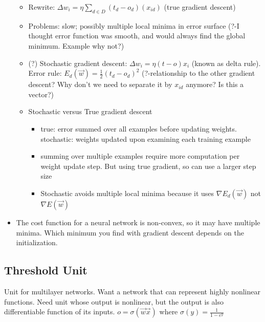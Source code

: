 \documentclass[11pt]{article}
\begin{document}
\begin{itemize}
\begin{itemize}
\item Rewrite: $\Delta w_i = \eta \sum_{d\in D} (t_d - o_d) (x_{id})$ (true gradient descent)
\item Problems: slow; possibly multiple local minima in error surface (?-I thought error function was smooth, and would always find the global minimum. Example why not?)
\item (?) Stochastic gradient descent: $\Delta w_i = \eta (t-o)x_i$ (known as delta rule). Error rule: $E_d(\vec{w}) = \frac{1}{2} (t_d - o_d)^2$ (?-relationship to the other gradient descent? Why don't we need to separate it by $x_{id}$ anymore? Is this a vector?)
\item Stochastic versus True gradient descent
\begin{itemize}
\item true: error summed over all examples before updating weights. stochastic: weights updated upon examining each training example
\item summing over multiple examples require more computation per weight update step. But using true gradient, so can use a larger step size
\item Stochastic avoids multiple local minima because it uses $\nabla E_d(\vec{w})$ not $\nabla E(\vec{w})$
\end{itemize}
\end{itemize}
\item The cost function for a neural network is non-convex, so it may have multiple minima. Which minimum you find with gradient descent depends on the initialization.
\end{itemize}

\subsection{Threshold Unit}
Unit for multilayer networks. Want a network that can represent highly nonlinear functions. Need unit whose output is nonlinear, but the output is also differentiable function of its inputs. $o = \sigma (\vec{w} \vec{x})$ where $\sigma(y) = \frac{1}{1-e^y}$
\end{document}
